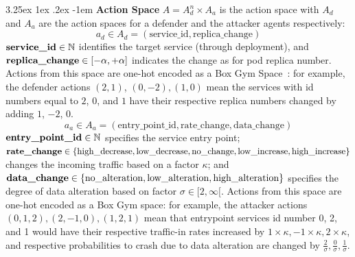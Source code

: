 \documentclass[conference]{IEEEtran}
\makeatletter
\renewcommand\paragraph{\@startsection{paragraph}{5}{\z@}%
  {3.25ex \@plus1ex \@minus.2ex}%
  {-1em}%
  {\normalfont\normalsize\bfseries}}
\makeatother
\begin{document}
\noindent \paragraph{\textbf{Action Space}} $A = A_d^n \times A_a$ is the action space with $A_d$ and $A_a$ are the action spaces for a defender and the attacker agents respectively:
$$
a_d \in A_d = (\text{service\_id}, \text{replica\_change})
$$
$\text{\textbf{service\_id}} \in \mathbb{N}$ identifies the target service (through deployment), and $\text{\textbf{replica\_change}} \in [-\alpha, +\alpha]$ indicates the change as for pod replica number. Actions from this space are one-hot encoded as a Box Gym Space~\cite{openAIGymActionSpaces}: for example, the defender actions $(2,1)$, $(0,-2), (1,0)$ mean the services with id numbers equal to $2$, $0$, and $1$ have their respective replica numbers changed by adding $1$, $-2$, $0$.
%
$$
a_a \in A_a = (\text{entry\_point\_id}, \text{rate\_change}, \text{data\_change})
$$
$\text{\textbf{entry\_point\_id}} \in \mathbb{N}$ specifies the service entry point;
$\text{\textbf{rate\_change}} \in \{\text{high\_decrease}, \text{low\_decrease}, \text{no\_change}, \allowbreak \text{low\_increase}, \allowbreak \text{high\_increase}\}$ changes the incoming traffic based on a factor $\kappa$; and $\text{\textbf{data\_change}} \in \{\text{no\_alteration}, \allowbreak \text{low\_alteration}, \allowbreak \text{high\_alteration}\}$ specifies the degree of data alteration based on factor $\sigma \in [2,\infty[$. Actions from this space are one-hot encoded as a Box Gym space: for example, the attacker actions $(0,1,2), (2,-1,0), (1,2,1)$ mean that entrypoint services id number 0, 2, and 1 would have their respective traffic-in rates increased by $1 \times \kappa, -1 \times \kappa, 2 \times \kappa$, and respective probabilities to crash due to data alteration are changed by $\frac{2}{\sigma}, \frac{0}{\sigma}, \frac{1}{\sigma}$.

\
\end{document}
